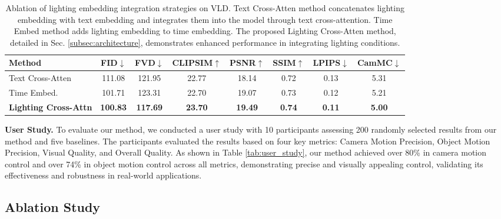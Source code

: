 \setlength{\tabcolsep}{1pt}
\begin{table}
\vspace{-5pt}
\scriptsize
\centering
\begin{tabular}{lccccccc}
\toprule
\textbf{Method}                & FID$\downarrow$    & FVD$\downarrow$    & CLIPSIM$\uparrow$ & PSNR$\uparrow$  & SSIM$\uparrow$ & LPIPS$\downarrow$ & CamMC$\downarrow$ \\
\midrule
Text Cross-Atten           & 111.08          & 121.95          & 22.77            & 18.14          & 0.72          & 0.13           & 5.31           \\
Time Embed.                & 101.71          & 123.31          & 22.70            & 19.07          & 0.73          & 0.12           & 5.21           \\
\rowcolor[HTML]{EFEFEF}
\textbf{Lighting Cross-Attn} & \textbf{100.83} & \textbf{117.69} & \textbf{23.70}   & \textbf{19.49} & \textbf{0.74} & \textbf{0.11}  & \textbf{5.00} \\
\bottomrule
\end{tabular}
\caption{Ablation of lighting embedding integration strategies on VLD. Text Cross-Atten method concatenates lighting embedding with text embedding and integrates them into the model through text cross-attention. Time Embed method adds lighting embedding to time embedding. The proposed Lighting Cross-Atten method, detailed in Sec. \ref{subsec:architecture}, demonstrates enhanced performance in integrating lighting conditions.}
\label{tab:ablation_lighting_embedding}
\vspace{-5pt}
\end{table}



\noindent\textbf{User Study.}
To evaluate our method, we conducted a user study with 10 participants assessing 200 randomly selected results from our method and five baselines. 
The participants evaluated the results based on four key metrics: Camera Motion Precision, Object Motion Precision, Visual Quality, and Overall Quality.
As shown in Table \ref{tab:user_study}, our method achieved over 80\% in camera motion control and over 74\% in object motion control across all metrics, demonstrating precise and visually appealing control, validating its effectiveness and robustness in real-world applications.



\subsection{Ablation Study}


